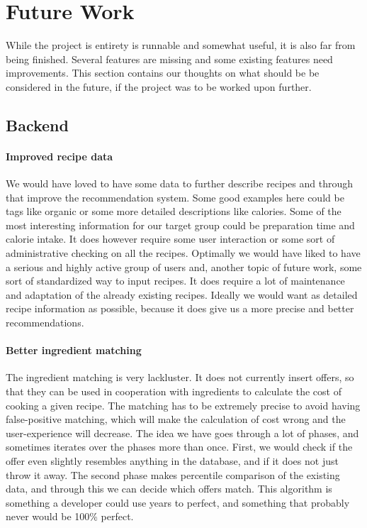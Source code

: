 \section{Future Work}
\label{sec:future}

While the project is entirety is runnable and somewhat useful, it is also far from being finished. Several features are missing and some existing features need improvements. This section contains our thoughts on what should be be considered in the future, if the project was to be worked upon further.

\subsection{Backend}

\paragraph{Improved recipe data} 
We would have loved to have some data to further describe recipes and through that improve the recommendation system. Some good examples here could be tags like organic or some more detailed descriptions like calories. Some of the most interesting information for our target group could be preparation time and calorie intake. It does however require some user interaction or some sort of administrative checking on all the recipes. Optimally we would have liked to have a serious and highly active group of users and, another topic of future work, some sort of standardized way to input recipes. It does require a lot of maintenance and adaptation of the already existing recipes. Ideally we would want as detailed recipe information as possible, because it does give us a more precise and better recommendations.

\paragraph{Better ingredient matching}
The ingredient matching is very lackluster. It does not currently insert offers, so that they can be used in cooperation with ingredients to calculate the cost of cooking a given recipe. The matching has to be extremely precise to avoid having false-positive matching, which will make the calculation of cost wrong and the user-experience will decrease. 
The idea we have goes through a lot of phases, and sometimes iterates over the phases more than once. First, we would check if the offer even slightly resembles anything in the database, and if it does not just throw it away. The second phase makes percentile comparison of the existing data, and through this we can decide which offers match. This algorithm is something a developer could use years to perfect, and something that probably never would be 100\% perfect.

